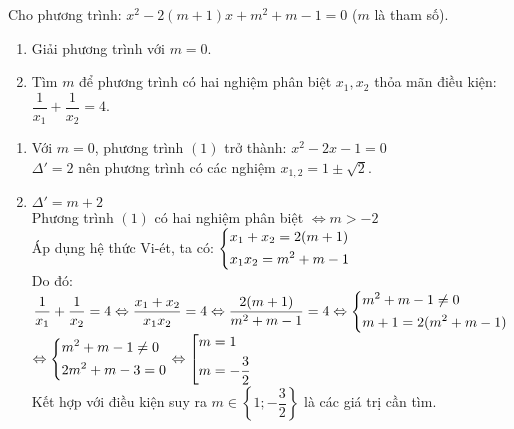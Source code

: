 \begin{ex}%
Cho phương trình: $x^2-2(m+1)x+m^2+m-1=0$ ($m$ là tham số).
\begin{enumerate}
\item Giải phương trình với $m=0$.
\item Tìm $m$ để phương trình có hai nghiệm phân biệt $x_1, x_2$ thỏa mãn điều kiện:  $\dfrac{1}{x_1}+\dfrac{1}{x_2}=4.$
\end{enumerate}
\loigiai
{
\begin{enumerate}
\item Với $m = 0$, phương trình $(1)$ trở thành: $x^2-2x-1=0$\\
$\Delta'=2$ nên phương trình có các nghiệm $x_{1,2}=1\pm \sqrt{2}$.
\item $\Delta'=m+2$\\
Phương trình $(1)$ có hai nghiệm phân biệt $\Leftrightarrow m>-2$\\
Áp dụng hệ thức Vi-ét, ta có: $\left\{\begin{aligned}&x_1+x_2=2(m+1)\\&x_1x_2=m^2+m-1\end{aligned}\right.$\\
Do đó:  $\dfrac{1}{x_1}+\dfrac{1}{x_2}=4\Leftrightarrow \dfrac{x_1+x_2}{x_1x_2}=4\Leftrightarrow\dfrac{2(m+1)}{m^2+m-1}=4\Leftrightarrow\left\{\begin{aligned}&m^2+m-1\neq 0\\&m+1=2(m^2+m-1)\end{aligned}\right.$\\
$\Leftrightarrow\left\{\begin{aligned}&m^2+m-1\neq 0\\&2m^2+m-3=0\end{aligned}\right.\Leftrightarrow\left[\begin{aligned}&m=1\\&m=-\dfrac{3}{2}\end{aligned}\right.$\\
Kết hợp với điều kiện suy ra $m\in\left\{1; -\dfrac{3}{2}\right\}$ là các giá trị cần tìm.
\end{enumerate}

}
\end{ex}

